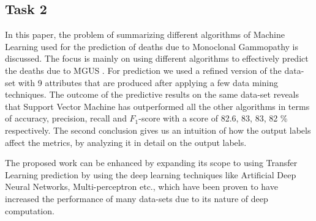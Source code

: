 \documentclass[conference]{IEEEtran}
\begin{document}
\subsection{Task 2}
In this paper, the problem of summarizing different algorithms of Machine Learning used for the prediction of deaths due to Monoclonal Gammopathy is discussed. The focus is mainly on using different algorithms to effectively predict the deaths due to MGUS \cite{monoclonal1} . For prediction we used a refined version of the data-set with 9 attributes that are produced after applying a few data mining techniques. The outcome of the predictive results on the same data-set reveals that Support Vector Machine has outperformed all the other algorithms in terms   of accuracy, precision, recall and $F_1$-score with a score of 82.6, 83, 83, 82 \% respectively. The second conclusion gives us an intuition of how the output labels affect the metrics, by analyzing it in detail on the output labels.
\par 
The proposed work can be enhanced by expanding its scope to using Transfer Learning prediction by using  the deep learning techniques \cite{dl,dl2}  like Artificial  Deep Neural Networks, Multi-perceptron etc.,
which have been proven to have increased the performance of many data-sets due to its nature of deep computation.







\end{document}
